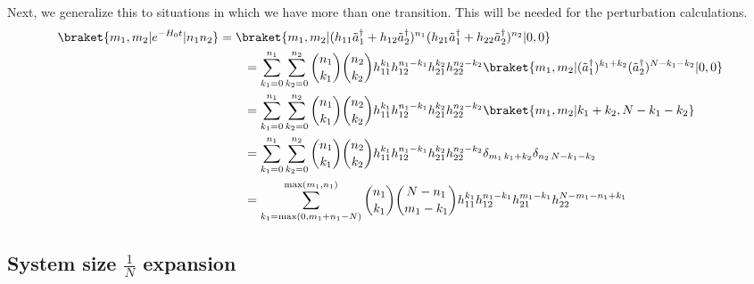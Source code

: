 Next, we generalize this to situations in which we have more than one transition.  This will be needed for the perturbation calculations.
\begin{align*}
\braket{ m_1, m_2 | e^{-H_0 t} | n_1 n_2 } &= 
\braket{ m_1, m_2 | (h_{11} {\tilde a}_1^\dagger +
                     h_{12} {\tilde a}_2^\dagger)^{n_1}
                    (h_{21} {\tilde a}_1^\dagger +
                     h_{22} {\tilde a}_2^\dagger)^{n_2}
 | 0, 0} \\ &\qquad=
\sum_{k_1 = 0}^{n_1} \sum_{k_2 = 0}^{n_2}
 {n_1 \choose k_1} {n_2 \choose k_2}
 h_{11}^{k_1} h_{12}^{n_1 - k_1}
 h_{21}^{k_2} h_{22}^{n_2 - k_2}
 \braket{ m_1, m_2 |
  ({\tilde a}_1^{\dagger})^{k_1 + k_2}
  ({\tilde a}_2^\dagger)^{N - k_1 - k_2} | 0, 0 } \\ &\qquad=
\sum_{k_1 = 0}^{n_1} \sum_{k_2 = 0}^{n_2}
 {n_1 \choose k_1} {n_2 \choose k_2}
 h_{11}^{k_1} h_{12}^{n_1 - k_1}
 h_{21}^{k_2} h_{22}^{n_2 - k_2}
 \braket{ m_1, m_2 | k_1 + k_2, N - k_1 - k_2 } \\ &\qquad=
\sum_{k_1 = 0}^{n_1} \sum_{k_2 = 0}^{n_2}
 {n_1 \choose k_1} {n_2 \choose k_2}
 h_{11}^{k_1} h_{12}^{n_1 - k_1}
 h_{21}^{k_2} h_{22}^{n_2 - k_2}
 \delta_{m_1 \, k_1 + k_2} \delta_{n_2 \, N - k_1 - k_2} \\
&\qquad= \sum_{k_1 = \max (0, m_1 + n_1 - N)}^{\max (m_1, n_1)}
 {n_1 \choose k_1} {N - n_1 \choose m_1 - k_1}
 h_{11}^{k_1} h_{12}^{n_1 - k_1}
 h_{21}^{m_1 - k_1} h_{22}^{N - m_1 - n_1 + k_1}
\end{align*}



\subsection{System size $\frac{1}{N}$ expansion}
